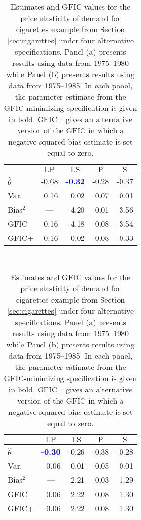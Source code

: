 \begin{table}[htbp]
  \centering
    \begin{subtable}[h]{0.45\textwidth}
        \centering
     \caption{1975--1980 ($T=6$)}
     \label{tab:cigarettesShort}
     \begin{tabular}{lrrrr}\hline\hline 
         & \multicolumn{1}{c}{$\text{LP}$} & \multicolumn{1}{c}{$\text{LS}$} 
          & \multicolumn{1}{c}{$\text{P}$} & \multicolumn{1}{c}{$\text{S}$}\\
        \hline
        $\widehat{\theta}$ & -0.68 & \textcolor{blue}{\textbf{-0.32}} &  -0.28 &  -0.37\\
        Var.\ & 0.16 &  0.02 & 0.07 & 0.01\\ 
        Bias$^2$ & \multicolumn{1}{c}{---} & -4.20 & 0.01 & -3.56 \\
        GFIC  & 0.16 & -4.18 & 0.08  & -3.54  \\
        GFIC+  & 0.16 &  0.02 & 0.08  & 0.33    \\
        \hline
      \end{tabular}
    \end{subtable}
    ~
    \begin{subtable}[h]{0.45\textwidth}
      \centering
     \caption{1975--1985 ($T=11$)}
     \label{tab:cigarettesLong}
     \begin{tabular}{lrrrr}\hline\hline 
         & \multicolumn{1}{c}{$\text{LP}$} & \multicolumn{1}{c}{$\text{LS}$} 
          & \multicolumn{1}{c}{$\text{P}$} & \multicolumn{1}{c}{$\text{S}$}\\
        \hline
        $\widehat{\theta}$ & \textcolor{blue}{\textbf{-0.30}} & -0.26 &  -0.38 &  -0.28\\
        Var.\ & 0.06 & 0.01 & 0.05 & 0.01\\ 
        Bias$^2$ & \multicolumn{1}{c}{---} & 2.21 & 0.03 & 1.29\\
        GFIC  &0.06 & 2.22 & 0.08 &  1.30\\
        GFIC+  & 0.06 & 2.22 & 0.08  & 1.30  \\
           \hline
      \end{tabular}
    \end{subtable}
    \caption{Estimates and GFIC values for the price elasticity of demand for cigarettes example from Section \ref{sec:cigarettes} under four alternative specifications. Panel (a) presents results using data from 1975--1980 while Panel (b) presents results using data from 1975--1985. In each panel, the parameter estimate from the GFIC-minimizing specification is given in bold. GFIC+ gives an alternative version of the GFIC in which a negative squared bias estimate is set equal to zero.}
    \label{tab:cigarettes}
\end{table}

